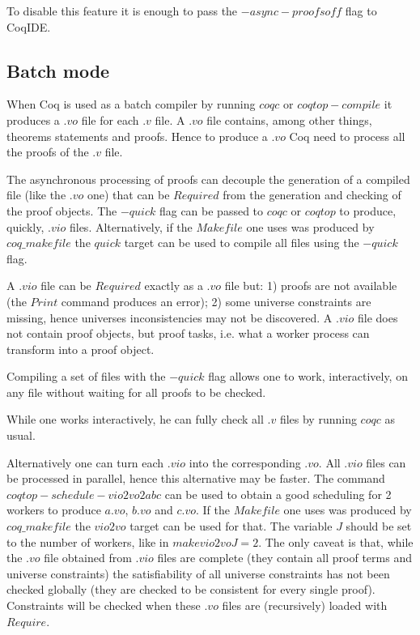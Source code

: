 To disable this feature it is enough to pass the $-async-proofs off$ flag to
CoqIDE.

\subsection{Batch mode}

When Coq is used as a batch compiler by running $coqc$ or $coqtop -compile$
it produces a $.vo$ file for each $.v$ file.  A $.vo$ file contains, among
other things, theorems statements and proofs.  Hence to produce a $.vo$
Coq need to process all the proofs of the $.v$ file.

The asynchronous processing of proofs can decouple the generation of a
compiled file (like the $.vo$ one) that can be $Required$ from the generation
and checking of the proof objects.  The $-quick$ flag can be passed to
$coqc$ or $coqtop$ to produce, quickly, $.vio$ files.  Alternatively, if
the $Makefile$ one uses was produced by $coq\_makefile$ the $quick$
target can be used to compile all files using the $-quick$ flag.

A $.vio$ file can be $Required$ exactly as a $.vo$ file but: 1) proofs are
not available (the $Print$ command produces an error); 2) some universe
constraints are missing, hence universes inconsistencies may not be
discovered.  A $.vio$ file does not contain proof objects, but proof tasks,
i.e. what a worker process can transform into a proof object.

Compiling a set of files with the $-quick$ flag allows one to work,
interactively, on any file without waiting for all proofs to be checked.

While one works interactively, he can fully check all $.v$ files by
running $coqc$ as usual.

Alternatively one can turn each $.vio$ into the corresponding $.vo$.
All $.vio$ files can be processed in parallel, hence this alternative
may be faster.  The command $coqtop -schedule-vio2vo 2 a b c$
can be used to obtain a good scheduling for 2 workers to produce
$a.vo$, $b.vo$ and $c.vo$.  If the $Makefile$ one uses was produced
by $coq\_makefile$ the $vio2vo$ target can be used for that.
The variable $J$ should be set to the number of workers, like
in $make vio2vo J=2$.  The only caveat is that, while the $.vo$ file
obtained from $.vio$ files are complete (they contain all proof terms
and universe constraints) the satisfiability of all universe constraints
has not been checked globally (they are checked to be consistent for
every single proof).  Constraints will be checked when these $.vo$ files
are (recursively) loaded with $Require$.

